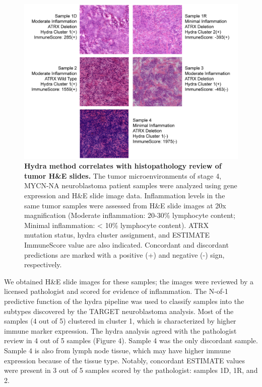 \documentclass[10pt,letterpaper]{article}
\begin{document}
\begin{figure}[!h]
	\includegraphics[width=\textwidth]{img/NBL-MYCN-NA-HE-2x}
	\caption{{\bf Hydra method correlates with histopathology review of tumor H\&E slides.}
		The tumor microenvironments of stage 4, MYCN-NA neuroblastoma patient samples were analyzed using gene expression and H\&E slide image data. Inflammation levels in the same tumor samples were assessed from H\&E slide images at 20x magnification (Moderate inflammation: 20-30\% lymphocyte content; Minimal inflammation: < 10\% lymphocyte content). ATRX mutation status, hydra cluster assignment, and ESTIMATE ImmuneScore value are also indicated. Concordant and discordant predictions are marked with a positive (+) and negative (-) sign, respectively.}
	\label{hefig}
\end{figure}

We obtained H\&E slide images for these samples; the images were reviewed by a licensed pathologist and scored for evidence of inflammation. The N-of-1 predictive function of the hydra pipeline was used to classify samples into the subtypes discovered by the TARGET neuroblastoma analysis. Most of the samples (4 out of 5) clustered in cluster 1, which is characterized by higher immune marker expression. The hydra analysis agreed with the pathologist review in 4 out of 5 samples (Figure 4). Sample 4 was the only discordant sample. Sample 4 is also from lymph node tissue, which may have higher immune expression because of the tissue type. Notably, concordant ESTIMATE values were present in 3 out of 5 samples scored by the pathologist: samples 1D, 1R, and 2.
\end{document}
